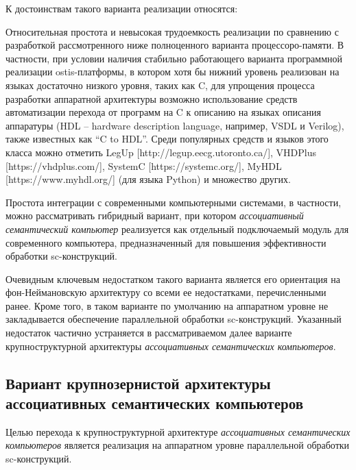 К достоинствам такого варианта реализации относятся:
\begin{textitemize}
	\item Относительная простота и невысокая трудоемкость реализации по сравнению с разработкой рассмотренного ниже полноценного варианта процессоро-памяти. В частности, при условии наличия стабильно работающего варианта программной реализации ostis-платформы, в котором хотя бы нижний уровень реализован на языках достаточно низкого уровня, таких как C, для упрощения процесса разработки аппаратной архитектуры возможно использование средств автоматизации перехода от программ на C к описанию на языках описания аппаратуры (HDL -- hardware description language, например, VSDL и Verilog), также известных как ``C to HDL''. Среди популярных средств и языков этого класса можно отметить LegUp [http://legup.eecg.utoronto.ca/], VHDPlus [https://vhdplus.com/], SystemC [https://systemc.org/], MyHDL [https://www.myhdl.org/] (для языка Python) и множество других.
	\item Простота интеграции с современными компьютерными системами, в частности, можно рассматривать гибридный вариант, при котором \textit{ассоциативный семантический компьютер} реализуется как отдельный подключаемый модуль для современного компьютера, предназначенный для повышения эффективности обработки sc-конструкций.
\end{textitemize}

Очевидным ключевым недостатком такого варианта является его ориентация на фон-Неймановскую архитектуру со всеми ее недостатками, перечисленными ранее. Кроме того, в таком варианте по умолчанию на аппаратном уровне не закладывается обеспечение параллельной обработки sc-конструкций. Указанный недостаток частично устраняется в рассматриваемом далее варианте крупноструктурной архитектуры \textit{ассоциативных семантических компьютеров}.

\subsection{Вариант крупнозернистой архитектуры ассоциативных семантических компьютеров}

Целью перехода к крупноструктурной архитектуре \textit{ассоциативных семантических компьютеров} является реализация на аппаратном уровне параллельной обработки sc-конструкций.

